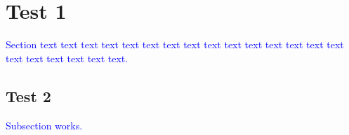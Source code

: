 \documentclass[phd]{ndsu-thesis-2022}
\newcommand\italk[1]{\textcolor{blue}{#1}}  %
\begin{document}
\section{Test 1}
\italk{Section text text text text text text text text text text text text text text text text text text text text text.}

\subsection{Test 2}
\italk{Subsection works.}

%
%

\end{document}
